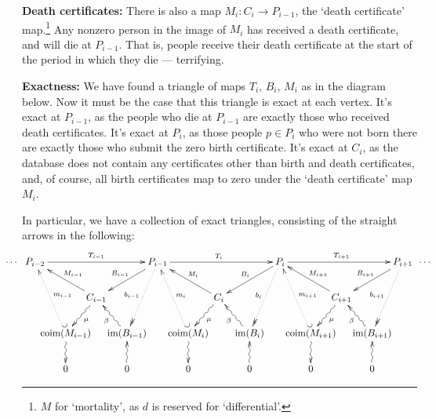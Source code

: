 \documentclass[11pt]{article}
\begin{document}
\begin{Births Deaths and Marriages}
\Bullet \textbf{Death certificates:} There is also a map $M_{i}:C_{i}\to
P_{i-1}$, the `death certificate' map.\footnote{$M$ for `mortality', as $d$ is
reserved for `differential'.} Any nonzero person in the image of $M_{i}$ has
received a death certificate, and will die at $P_{i-1}$. That is, people receive
their death certificate at the start of the period in which they die ---
terrifying.

\Bullet \textbf{Exactness:} We have found a triangle of maps
$T_{i},\,B_{i},\,M_{i}$ as in the diagram below. Now it must be the case that
this triangle is exact at each vertex. It's exact at $P_{i-1}$, as the people
who die at $P_{i-1}$ are exactly those who received death certificates. It's
exact at $P_i$, as those people $p\in P_i$ who were not born there are exactly
those who submit the zero birth certificate. It's exact at $C_i$, as the
database does not contain any certificates other than birth and death
certificates, and, of course, all birth certificates map to zero under the
`death certificate' map $M_i$.

In particular, we have a collection of exact triangles, consisting of the
straight arrows in the following:
\[\xymatrix@!0@C=1.1cm@R=1.28cm{
\makebox[0cm][r]{$\cdots$\ \ }
P_{i-2}\ar[rrrr]^{T_{i-1}}%
&&&&\ar[dll]_{B_{i-1}}
\ar@{..>>}[ddl]_{b_{i-1}}
P_{i-1}\ar[rrrr]^{T_{i  }}%
&&&&\ar[dll]_{B_{i  }}
\ar@{..>>}[ddl]_{b_{i  }}
P_{i  }\ar[rrrr]^{T_{i+1}}%
&&&&\ar[dll]_{B_{i+1}}
\ar@{..>>}[ddl]_{b_{i+1}}
P_{i+1}\makebox[0cm][l]{\ \ $\cdots$}\\
&&C_{i-1}\ar[ull]_{M_{i-1}}\ar@{~>}[dl]^\mu&&
&&C_{i  }\ar[ull]_{M_{i  }}\ar@{~>}[dl]^\mu&&
&&C_{i+1}\ar[ull]_{M_{i+1}}\ar@{~>}[dl]^\mu&&
\\
&\coim(M_{i-1})\ar@{~>}[d]\ar@{_{(}..>}[uul]_{m_{i-1}}
&&\im(B_{i-1})\ar@{~>}[ul]^\beta&
&\coim(M_{i  })\ar@{~>}[d]\ar@{_{(}..>}[uul]_{m_{i  }}
&&\im(B_{i  })\ar@{~>}[ul]^\beta&
&\coim(M_{i+1})\ar@{~>}[d]\ar@{_{(}..>}[uul]_{m_{i+1}}
&&\im(B_{i+1})\ar@{~>}[ul]^\beta&
\\
&0&&0\ar@{~>}[u]&
&0&&0\ar@{~>}[u]&
&0&&0\ar@{~>}[u]&
}\]


\end{Births Deaths and Marriages}
\end{document}
